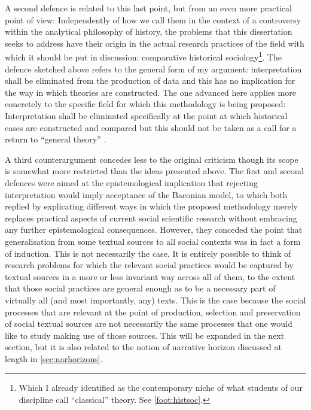A second defence is related to this last point, but from an even more practical point of view:
Independently of how we call them in the context of a controversy within the analytical philosophy of history, the problems that this dissertation seeks to address have their origin in the actual research practices of the field with which it should be put in discussion: comparative historical sociology\footnote{
    Which I already identified as the contemporary niche of what students of our discipline call ``classical'' theory.
    See \autoref{foot:histsoc}.
}.
The defence sketched above refers to the general form of my argument: interpretation shall be eliminated from the production of data and this has no implication for the way in which theories are constructed.
The one advanced here applies more concretely to the specific field for which this methodology is being proposed: Interpretation shall be eliminated specifically at the point at which historical cases are constructed and compared but this should not be taken as a call for a return to ``general theory'' \citep{kiser1991}.

A third counterargument concedes less to the original criticism though its scope is somewhat more restricted than the ideas presented above.
The first and second defences were aimed at the epistemological implication that rejecting interpretation would imply acceptance of the Baconian model, to which both replied by explicating different ways in which the proposed methodology merely replaces practical aspects of current social scientific research without embracing any further epistemological consequences.
However, they conceded the point that generalisation from some textual sources to all social contexts was in fact a form of induction.
This is not necessarily the case.
It is entirely possible to think of research problems for which the relevant social practices would be captured by textual sources in a more or less invariant way across all of them, to the extent that those social practices are general enough as to be a necessary part of virtually all (and most importantly, any) texts.
This is the case because the social processes that are relevant at the point of production, selection and preservation of social textual sources are not necessarily the same processes that one would like to study making use of those sources.
This will be expanded in the next section, but it is also related to the notion of narrative horizon discussed at length in \autoref{sec:narhorizons}.

